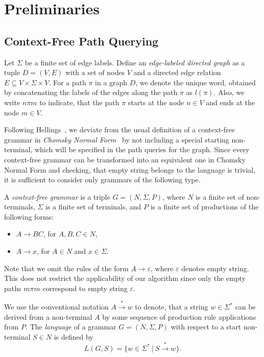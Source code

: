 \section{Preliminaries}
\label{section_preliminaries}

\subsection{Context-Free Path Querying}
Let $\Sigma$ be a finite set of edge labels. Define an \emph{edge-labeled directed graph} as a tuple \mbox{$D = (V, E)$} with a set of nodes $V$ and a directed edge relation \mbox{$E \subseteq V \times \Sigma \times V$}.  For a path $\pi$ in a graph $D$, we denote the unique word, obtained by concatenating the labels of the edges along the path $\pi$ as \mbox{$l(\pi)$}. Also, we write \mbox{$n \pi m$} to indicate, that the path $\pi$ starts at the node \mbox{$n \in V$} and ends at the node \mbox{$m \in V$}.

Following Hellings~\cite{hellingsRelational}, we deviate from the usual definition of a context-free grammar in \emph{Chomsky Normal Form}~\cite{chomsky} by not including a special starting non-terminal, which will be specified in the path queries for the graph. Since every context-free grammar can be transformed into an equivalent one in Chomsky Normal Form and checking, that empty string belongs to the language is trivial, it is sufficient to consider only grammars of the following type.

A \emph{context-free grammar} is a triple \mbox{$G = (N, \Sigma, P)$}, where $N$ is a finite set of non-terminals, $\Sigma$ is a finite set of terminals, and $P$ is a finite set of productions of the following forms:

\begin{itemize}
    \item $A \rightarrow B C$, for $A,B,C \in N$,
    \item $A \rightarrow x$, for $A \in N$ and $x \in \Sigma$.   
\end{itemize}

Note that we omit the rules of the form \mbox{$A \rightarrow \varepsilon$}, where $\varepsilon$ denotes empty string. This does not restrict the applicability of our algorithm since only the empty paths \mbox{$m \pi m$} correspond to empty string $\varepsilon$.

We use the conventional notation \mbox{$A \xrightarrow{*} w$} to denote, that a string \mbox{$w \in \Sigma^*$} can be derived from a non-terminal $A$ by some sequence of production rule applications from $P$. The \emph{language} of a grammar \mbox{$G = (N,\Sigma,P)$} with respect to a start non-terminal \mbox{$S \in N$} is defined by $$L(G,S) = \{w \in \Sigma^*~|~S \xrightarrow{*} w\}.$$

